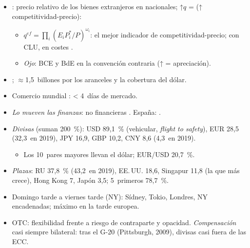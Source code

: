 \documentclass{article}
\begin{document}
\begin{columnas}
\begin{itemize}
\item {}: precio relativo de los bienes extranjeros en nacionales; ↑$q$ =  (↑ competitividad-precio):
  \begin{itemize}
  \item {} $q^{ef}=\prod_i(E_iP^{*}_i/P)^{\omega_i}$: el mejor indicador de competitividad-precio; con CLU, en costes .
  \item \emph{Ojo}: BCE y BdE en la convención contraria (↑ = apreciación).
  \end{itemize}
\end{itemize}

\begin{itemize}
\item {}; $\approx$1,5~billones por los aranceles y la cobertura del dólar.
\item Comercio mundial : < 4~días de mercado.
\item \emph{Lo mueven las finanzas}: no financieras . España: .
\end{itemize}
\begin{itemize}
\item \emph{Divisas} (suman 200~\%): USD 89,1~\% (vehicular, \emph{flight to safety}), EUR 28,5 (32,3~en 2019), JPY 16,9, GBP 10,2, CNY 8,6 (4,3~en 2019).
  \begin{itemize}
  \item Los 10~pares mayores llevan el dólar; EUR/USD 20,7~\%.
  \end{itemize}
\item \emph{Plazas}: RU 37,8~\% (43,2~en 2019), EE.\,UU. 18,6, Singapur 11,8 (la que más crece), Hong Kong 7, Japón 3,5; 5~primeros 78,7~\%.
\end{itemize}
\begin{itemize}
\item Domingo tarde a viernes tarde (NY): Sídney, Tokio, Londres, NY encadenadas; máximo en la tarde europea.
\end{itemize}
\begin{itemize}
\item OTC: flexibilidad frente a riesgo de contraparte y opacidad. \emph{Compensación} casi siempre bilateral: tras el G-20 (Pittsburgh, 2009), divisas casi fuera de las ECC.

\end{itemize}
\end{columnas}
\end{document}
